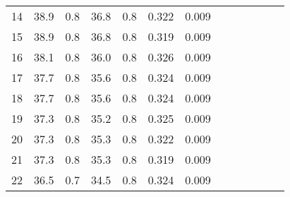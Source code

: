 \begin{tabular}{lrrrrrrrrrrrr}
	14 & 38.9             & 0.8                     & 36.8              & 0.8                      & 0.322         & 0.009                \\
	15 & 38.9             & 0.8                     & 36.8              & 0.8                      & 0.319         & 0.009                \\
	16 & 38.1             & 0.8                     & 36.0              & 0.8                      & 0.326         & 0.009                \\
	17 & 37.7             & 0.8                     & 35.6              & 0.8                      & 0.324         & 0.009                \\
	18 & 37.7             & 0.8                     & 35.6              & 0.8                      & 0.324         & 0.009                \\
	19 & 37.3             & 0.8                     & 35.2              & 0.8                      & 0.325         & 0.009                \\
	20 & 37.3             & 0.8                     & 35.3              & 0.8                      & 0.322         & 0.009                \\
	21 & 37.3             & 0.8                     & 35.3              & 0.8                      & 0.319         & 0.009                \\
	22 & 36.5             & 0.7                     & 34.5              & 0.8                      & 0.324         & 0.009                \\
	\bottomrule
\end{tabular}
